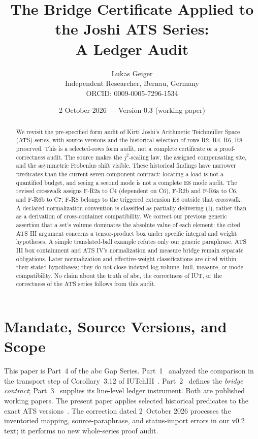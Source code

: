 \documentclass[11pt,a4paper]{article}
\title{The Bridge Certificate Applied to the Joshi ATS Series:\\A Ledger Audit}
\author{Lukas Geiger\\\small Independent Researcher, Bernau, Germany\\\small ORCID: 0009-0005-7296-1534}
\date{2 October 2026 --- Version 0.3 (working paper)}
\begin{document}
\maketitle

\begin{abstract}
We revisit the pre-specified form audit of Kirti Joshi's Arithmetic
Teichmüller Space (ATS) series, with source versions and the historical
selection of rows R2, R4, R6, R8 preserved. This is a selected-rows form
audit, not a complete certificate or a proof-correctness audit. The source
makes the $j^2$-scaling law, the assigned compensating site, and the
asymmetric Frobenius shift visible. These historical findings have narrower
predicates than the current seven-component contract: locating a load is
not a quantified budget, and seeing a second mode is not a complete E8
mode audit. The revised crosswalk assigns F-R2a to C4 (dependent on C6),
F-R2b and F-R6a to C6, and F-R6b to C7; F-R8 belongs to the triggered
extension E8 outside that crosswalk. A declared normalization convention
is classified as partially delivering (I), rather than as a derivation of
cross-container compatibility. We correct our previous generic assertion
that a set's volume dominates the absolute value of each element: the cited
ATS III argument concerns a tensor-product box under specific integral
and weight hypotheses. A simple translated-ball example refutes only our
generic paraphrase. ATS III box containment and ATS IV's normalization
and measure bridge remain separate obligations. Later normalization and
effective-weight classifications are cited within their stated hypotheses;
they do not close indexed log-volume, hull, measure, or mode compatibility.
No claim about the truth of abc, the correctness of IUT, or the correctness
of the ATS series follows from this audit.
\end{abstract}

\clearpage
\tableofcontents
\clearpage

\section{Mandate, Source Versions, and Scope}\label{sec:mandate}

This paper is Part~4 of the abc Gap Series. Part~1~\cite{part1}
analyzed the comparison in the transport step of Corollary~3.12
of IUTchIII~\cite{mochizukiIUT}. Part~2~\cite{part2} defines the
\emph{bridge contract}; Part~3~\cite{part3} supplies its line-level
ledger instrument. Both are published working papers. The present
paper applies selected historical predicates to the exact ATS
versions~\cite{joshiI,joshiII,joshiIIhalf,joshiIII,joshiIV}.
The correction dated 2~October 2026 processes the inventoried
mapping, source-paraphrase, and status-import errors in our v0.2 text;
it performs no new whole-series proof audit.
\end{document}
